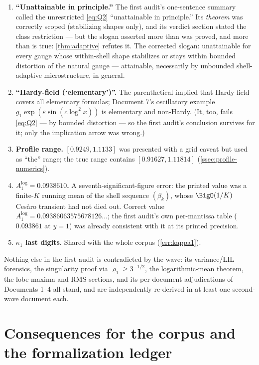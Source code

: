 \documentclass[11pt,oneside]{article}
\theoremstyle{definition}
\theoremstyle{remark}
\begin{document}
\begin{enumerate}
\item \textbf{``Unattainable in principle.''}  The first audit's
one-sentence summary called the unrestricted \eqref{eq:Q2}
``unattainable in principle.''  Its \emph{theorem} was correctly scoped
(stabilizing shapes only), and its verdict section stated the class
restriction --- but the slogan asserted more than was proved, and more
than is true: \cref{thm:adaptive} refutes it.  The corrected slogan:
unattainable for every gauge whose within-shell shape stabilizes or
stays within bounded distortion of the natural gauge --- attainable,
necessarily by unbounded shell-adaptive microstructure, in general.
\item \textbf{``Hardy-field (`elementary')''.}  The parenthetical
implied that Hardy-field covers all elementary formulas; Document 7's
oscillatory example $g_1\exp(\varepsilon\sin(c\log^2x))$ is elementary
and non-Hardy.  (It, too, fails \eqref{eq:Q2} --- by bounded
distortion --- so the first audit's conclusion survives for it; only
the implication arrow was wrong.)
\item \textbf{Profile range.}  $[0.9249,1.1133]$ was presented with a
grid caveat but used as ``the'' range; the true range contains
$[0.91627,1.11814]$ (\cref{ssec:profile-numerics}).
\item \textbf{$A_1^{\log}=0.0938610$.}  A seventh-significant-figure
error: the printed value was a finite-$K$ running mean of the shell
sequence $(\beta_k)$, whose $\BigO(1/K)$ Ces\`aro transient had not
died out.  Correct value $A_1^{\log}=0.09386063575678126\ldots$; the
first audit's own per-mantissa table ($0.093861$ at $y=1$) was already
consistent with it at its printed precision.
\item \textbf{$\kappa_1$ last digits.}  Shared with the whole corpus
(\cref{err:kappa1}).
\end{enumerate}

Nothing else in the first audit is contradicted by the wave: its
variance/LIL forensics, the singularity proof via
$\varrho_1\ge3^{-1/2}$, the logarithmic-mean theorem, the lobe-maxima
and RMS sections, and its per-document adjudications of Documents 1--4
all stand, and are independently re-derived in at least one second-wave
document each.

\section{Consequences for the corpus and the formalization ledger}
\label{sec:lean}
\end{document}
